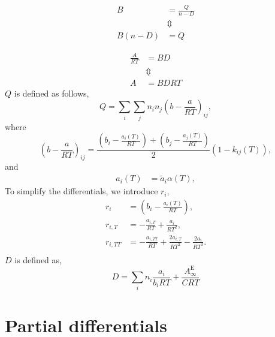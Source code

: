 \documentclass[internal,english]{sintefmemo2012}
\newcommand{\excess}{\text{E}}
\begin{document}
\begin{align}
  B &= \frac{Q}{n-D}   \label{eq:bm}\\
  &\Updownarrow \nonumber\\
  B(n-D) &= Q\label{eq:bm_diff}
\end{align}

\begin{align}
  \frac{A}{RT} &= BD
  \label{eq:am}\\
  &\Updownarrow \nonumber\\
  A &= BDRT
  \label{eq:am_diff}
\end{align}
$Q$ is defined as follows,
\begin{equation}
  Q = \underset{i}{\sum}\underset{j}{\sum}n_in_j\left(b-\frac{a}{RT}\right)_{ij},   \label{eq:Q}
\end{equation}
where
\begin{equation}
\left(b-\frac{a}{RT}\right)_{ij} =\frac{\left(b_i-\frac{a_i(T)}{RT}\right) + \left(b_j-\frac{a_j(T)}{RT}\right)}{2}\left(1-k_{ij}\left(T\right)\right),
\end{equation}
and
\begin{align}
   a_{i}(T) &= \tilde{a}_i \alpha(T),   \label{eq:aai}
\end{align}
To simplify the differentials, we introduce $r_i$,
\begin{align}
  r_i&=\left(b_i-\frac{a_i(T)}{RT}\right),\\
  r_{i,T}&=-\frac{a_{i,T}}{RT} + \frac{a_i}{RT^2},\\
  r_{i,TT}&=-\frac{a_{i,TT}}{RT} + \frac{2a_{i,T}}{RT^2} - \frac{2a_{i}}{RT^3}.\\
\end{align}
$D$ is defined as,
\begin{equation}
  D = \underset{i}{\sum}n_i\frac{a_i}{b_iRT} + \frac{A_\infty^\excess}{CRT} \label{eq:D}
\end{equation}
\section{Partial differentials}
\end{document}
